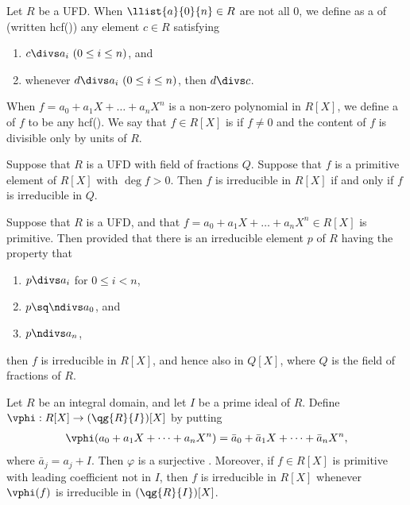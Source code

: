 \documentclass{article}
\begin{document}
  \begin{definition}
    Let $ R $ be a UFD. When $ \llist{a}{0}{n}\in R $ are not all 0, we define as a  of  (written hcf()) any element $ c\in R $ satisfying \begin{enumerate}[label=(\roman*)]
      \item $ c\divs a_i\ (0\leq i\leq n) $, and
      \item whenever $ d\divs a_i\ (0\leq i\leq n) $, then $ d\divs c $.
    \end{enumerate}
    When $ f=a_0+a_1X+\ldots +a_nX^n $ is a non-zero polynomial in $ R[X] $, we define a  of $ f $ to be any hcf().
    We say that $ f\in R[X] $ is  if $ f\neq 0 $ and the content of $ f $ is divisible only by units of $ R $.
  \end{definition}

  \begin{theorem}
    Suppose that $ R $ is a UFD with field of fractions $ Q $.
    Suppose that $ f $ is a primitive element of $ R[X] $ with $ \deg f > 0 $.
    Then $ f $ is irreducible in $ R[X] $ if and only if $ f $ is irreducible in $ Q $.
  \end{theorem}

  \begin{theorem}
    Suppose that $ R $ is a UFD, and that $ f=a_0+a_1X+\ldots +a_nX^n \in R[X] $ is primitive.
    Then provided that there is an irreducible element $ p $ of $ R $ having the property that \begin{enumerate}[label=(\roman*)]
      \item $ p\divs a_i $ for $ 0\leq i < n $,
      \item $ p\sq \ndivs a_0 $, and
      \item $ p\ndivs a_n $,
    \end{enumerate}
    then $ f $ is irreducible in $ R[X] $, and hence also in $ Q[X] $, where $ Q $ is the field of fractions of $ R $.
  \end{theorem}

  \begin{theorem}
    Let $ R $ be an integral domain, and let $ I $ be a prime ideal of $ R $.
    Define $ \vphi:R[X]\to (\qg{R}{I})[X] $ by putting \begin{align*}
      \vphi(a_0+a_1X+\cdots+a_nX^n) =\bar a_0+\bar a_1X+\cdots+\bar a_nX^n,
    \end{align*}
    where $ \bar a_j = a_j + I $.
    Then $ \varphi $ is a surjective \homo.
    Moreover, if $ f\in R[X] $ is primitive with leading coefficient not in $ I $, then $ f $ is irreducible in $ R[X] $ whenever $ \vphi(f) $ is irreducible in $ (\qg{R}{I})[X] $.
  \end{theorem}
\end{document}
